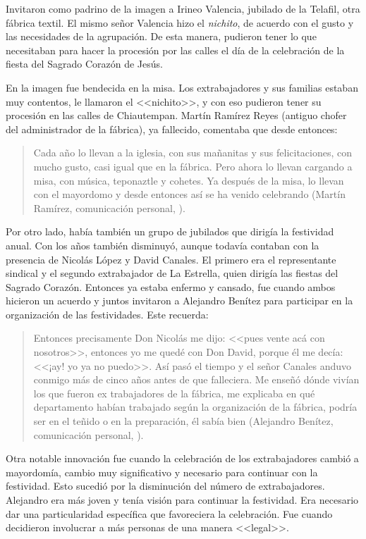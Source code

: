 \documentclass[14pt,letterpaper,twoside]{extbook} %
\begin{document}
Invitaron como padrino de la imagen a Irineo Valencia, jubilado de la Telafil, otra fábrica textil. El mismo señor Valencia hizo el \textit{nichito}, de acuerdo con el gusto y las necesidades de la agrupación. De esta manera, pudieron tener lo que necesitaban para hacer la procesión por las calles el día de la celebración de la fiesta del Sagrado Corazón de Jesús.

En  la imagen fue bendecida en la misa. Los extrabajadores y sus familias estaban muy contentos, le llamaron el <<nichito>>, y con eso pudieron tener su procesión en las calles de Chiautempan. Martín Ramírez Reyes (antiguo chofer del administrador de la fábrica), ya fallecido, comentaba que desde entonces:

\begin{quotation}
\noindent Cada año lo llevan a la iglesia, con sus mañanitas y sus felicitaciones, con mucho gusto, casi igual que en la fábrica. Pero ahora lo llevan cargando a misa, con música, teponaztle y cohetes. Ya después de la misa, lo llevan con el mayordomo y desde entonces así se ha venido celebrando (Martín Ramírez, comunicación personal, ).
\end{quotation}

\noindent Por otro lado, había también un grupo de jubilados que dirigía la festividad anual. Con los años también disminuyó, aunque todavía contaban con la presencia de Nicolás López y David Canales. El primero era el representante sindical y el segundo extrabajador de La Estrella, quien dirigía las fiestas del Sagrado Corazón. Entonces ya estaba enfermo y cansado, fue cuando ambos hicieron un acuerdo y juntos invitaron a Alejandro Benítez para participar en la organización de las festividades. Este recuerda:

\begin{quotation}
\noindent Entonces precisamente Don Nicolás me dijo: <<pues vente acá con nosotros>>, entonces yo me quedé con Don David, porque él me decía: <<¡ay! yo ya no puedo>>. Así pasó el tiempo y el señor Canales anduvo conmigo más de cinco años antes de que falleciera. Me enseñó dónde vivían los que fueron ex trabajadores de la fábrica, me explicaba en qué departamento habían trabajado según la organización de la fábrica, podría ser en el teñido o en la preparación, él sabía bien (Alejandro Benítez, comunicación personal, ).
\end{quotation}

\noindent Otra notable innovación fue cuando la celebración de los extrabajadores cambió a mayordomía, cambio muy significativo y necesario para continuar con la festividad. Esto sucedió por la disminución del número de extrabajadores. Alejandro era más joven y tenía visión para
continuar la festividad. Era necesario dar una particularidad específica que favoreciera la celebración. Fue cuando decidieron involucrar a más personas de una manera <<legal>>.
\end{document}
